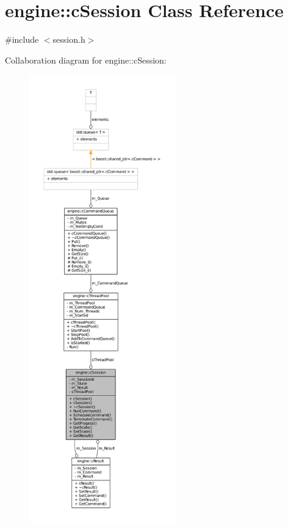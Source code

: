 \hypertarget{classengine_1_1cSession}{\section{engine\-:\-:c\-Session \-Class \-Reference}
\label{classengine_1_1cSession}
}


{\ttfamily \#include $<$session.\-h$>$}



\-Collaboration diagram for engine\-:\-:c\-Session\-:
\nopagebreak
\begin{figure}[H]
\begin{center}
\leavevmode
\includegraphics[height=550pt]{classengine_1_1cSession__coll__graph}
\end{center}
\end{figure}
